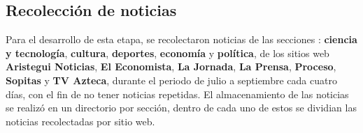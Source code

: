 \begin{table}[H]
\centering
{}
\caption{Ejemplo de estructura de un archivo CSV}
\label{tab:csv}
\end{table}

\subsection{Recolección de noticias}

Para el desarrollo de esta etapa, se recolectaron noticias de las secciones : \textbf{ciencia y tecnología}, \textbf{cultura}, \textbf{deportes}, \textbf{economía} y \textbf{política}, de los sitios web \textbf{Aristegui Noticias}, \textbf{El Economista}, \textbf{La Jornada}, \textbf{La Prensa}, \textbf{Proceso}, \textbf{Sopitas} y \textbf{TV Azteca}, durante el periodo de julio a septiembre cada cuatro días, con el fin de no tener noticias repetidas. El almacenamiento de las noticias se realizó en un directorio por sección, dentro de cada uno de estos se dividian las noticias recolectadas por sitio web. 
\\

